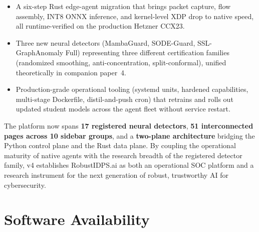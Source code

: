 \documentclass[11pt,a4paper]{article}
\begin{document}
\begin{itemize}[nosep,leftmargin=*]
  \item A six-step Rust edge-agent migration that brings packet
        capture, flow assembly, INT8 ONNX inference, and kernel-level
        XDP drop to native speed, all runtime-verified on the
        production Hetzner CCX23.
  \item Three new neural detectors (MambaGuard, SODE-Guard,
        SSL-GraphAnomaly Full) representing three different
        certification families (randomized smoothing, anti-concentration,
        split-conformal), unified theoretically in companion paper~4.
  \item Production-grade operational tooling (systemd units, hardened
        capabilities, multi-stage Dockerfile, distil-and-push cron)
        that retrains and rolls out updated student models across the
        agent fleet without service restart.
\end{itemize}

The platform now spans \textbf{17 registered neural detectors},
\textbf{51 interconnected pages across 10 sidebar groups}, and a
\textbf{two-plane architecture} bridging the Python control plane and
the Rust data plane.  By coupling the operational maturity of native
agents with the research breadth of the registered detector family,
v4 establishes RobustIDPS.ai as both an operational SOC platform and
a research instrument for the next generation of robust, trustworthy
AI for cybersecurity.

\section*{Software Availability}
\end{document}
